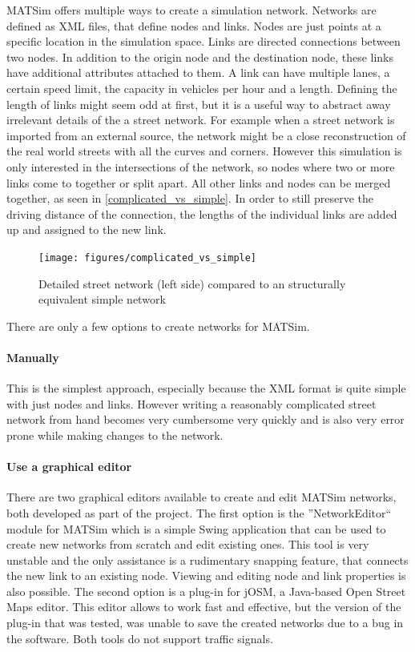 MATSim offers multiple ways to create a simulation network. Networks are defined as XML files, that define nodes and links. Nodes are just points at a specific location in the simulation space. Links are directed connections between two nodes. In addition to the origin node and the destination node, these links have additional attributes attached to them. A link can have multiple lanes, a certain speed limit, the capacity in vehicles per hour and a length. Defining the length of links might seem odd at first, but it is a useful way to abstract away irrelevant details of the a street network. For example when a street network is imported from an external source, the network might be a close reconstruction of the real world streets with all the curves and corners. However this simulation is only interested in the intersections of the network, so nodes where two or more links come to together or split apart. All other links and nodes can be merged together, as seen in \autoref{complicated_vs_simple}. In order to still preserve the driving distance of the connection, the lengths of the individual links are added up and assigned to the new link.

\begin{figure}[ht!]
	\centering
	\texttt{[image: figures/complicated\_vs\_simple]}
	\caption{Detailed street network (left side) compared to an structurally equivalent simple network}
	\label{complicated_vs_simple}
\end{figure}

There are only a few options to create networks for MATSim.

\paragraph{Manually} This is the simplest approach, especially because the XML format is quite simple with just nodes and links. However writing a reasonably complicated street network from hand becomes very cumbersome very quickly and is also very error prone while making changes to the network.

\paragraph{Use a graphical editor} There are two graphical editors available to create and edit MATSim networks, both developed as part of the project. The first option is the ''NetworkEditor`` module for MATSim which is a simple Swing application that can be used to create new networks from scratch and edit existing ones. This tool is very unstable and the only assistance is a rudimentary snapping feature, that connects the new link to an existing node. Viewing and editing node and link properties is also possible. The second option is a plug-in for jOSM, a Java-based Open Street Maps editor. This editor allows to work fast and effective, but the version of the plug-in that was tested, was unable to save the created networks due to a bug in the software. Both tools do not support traffic signals.

